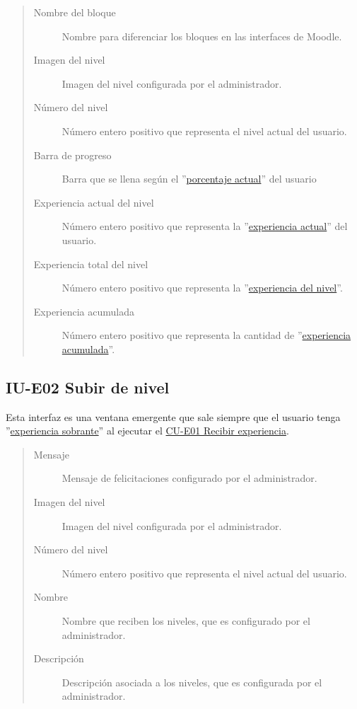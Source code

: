     \begin{quote}
    \begin{description}
    	\item[Nombre del bloque] Nombre para diferenciar los bloques en las interfaces de Moodle.
    	\item[Imagen del nivel] Imagen del nivel configurada por el administrador.
    	\item[Número del nivel] Número entero positivo que representa el nivel actual del usuario.
    	\item[Barra de progreso] Barra que se llena según el ''\hyperref[table:METerminosExperiencia1]{porcentaje actual}'' del usuario
    	\item[Experiencia actual del nivel] Número entero positivo que representa la ''\hyperref[table:METerminosExperiencia1]{experiencia actual}'' del usuario.
    	\item[Experiencia total del nivel] Número entero positivo que representa la ''\hyperref[table:METerminosExperiencia1]{experiencia del nivel}''.
    	\item[Experiencia acumulada] Número entero positivo que representa la cantidad de ''\hyperref[table:METerminosExperiencia1]{experiencia acumulada}''.
    \end{description}
    \end{quote}
	\clearpage
    
\subsection*{IU-E02 Subir de nivel}
\label{IUE02}

    Esta interfaz es una ventana emergente que sale siempre que el usuario tenga ''\hyperref[table:METerminosExperiencia1]{experiencia sobrante}'' al ejecutar el \hyperref[CU-E01]{CU-E01 Recibir experiencia}.    

    
    \begin{quote}
    \begin{description}
    	\item[Mensaje] Mensaje de felicitaciones configurado por el administrador.
    	\item[Imagen del nivel] Imagen del nivel configurada por el administrador.
    	\item[Número del nivel] Número entero positivo que representa el nivel actual del usuario.
    	\item[Nombre] Nombre que reciben los niveles, que es configurado por el administrador.
    	\item[Descripción] Descripción asociada a los niveles, que es configurada por el administrador.
    \end{description}
    \end{quote}
	\clearpage

